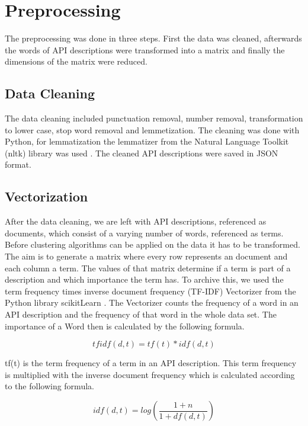 \documentclass[a4paper]{IEEEtran}
\begin{document}
\section{Preprocessing}
The preprocessing was done in three steps. First the data was cleaned, afterwards the words of API descriptions were transformed into a matrix and finally the dimensions of the matrix were reduced.

\subsection{Data Cleaning}
The data cleaning included punctuation removal, number removal, transformation to lower case, stop word removal and lemmetization. The cleaning was done with Python, for lemmatization the lemmatizer from the Natural Language Toolkit (nltk) library was used \cite{bird2009natural}. The cleaned API descriptions were saved in JSON format.

\subsection{Vectorization}
After the data cleaning, we are left with API descriptions, referenced as documents, which consist of a varying number of words, referenced as terms. Before clustering algorithms can be applied on the data it has to be transformed. The aim is to generate a matrix where every row represents an document and each column a term. The values of that matrix determine if a term is part of a description and which importance the term has. To archive this, we used the term frequency times inverse document frequency (TF-IDF) Vectorizer from the Python library scikitLearn \cite{scikit-learn}. The Vectorizer counts the frequency of a word in an API description and the frequency of that word in the whole data set. The importance of a Word then is calculated by the following formula.

\begin{equation*}
tfidf (d,t) = tf(t) * idf(d,t) 
\end{equation*}

tf(t) is the term frequency of a term in an API description. This term frequency is multiplied with the inverse document frequency which is calculated according to the following formula.

\begin{equation*}
idf (d,t) = log\left( \frac{1+n}{1+df(d,t)} \right)
\end{equation*}
\end{document}
